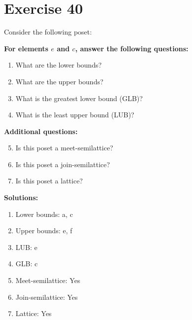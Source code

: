 \documentclass{article}
\begin{document}
\section*{Exercise 40}
Consider the following poset:
\begin{center}
\end{center}

    \textbf{For elements $e$ and $c$, answer the following questions:}
\begin{enumerate}
    \item What are the lower bounds?
    \item What are the upper bounds?
    \item What is the greatest lower bound (GLB)?
    \item What is the least upper bound (LUB)?
\end{enumerate}
    \hspace*{3ex} \textbf{Additional questions:}
\begin{enumerate}
    \setcounter{enumi}{4}
    \item Is this poset a meet-semilattice?
    \item Is this poset a join-semilattice?
    \item Is this poset a lattice?
\end{enumerate}

\textbf{Solutions:}
\begin{enumerate}
    \item Lower bounds: {a, c}
    \item Upper bounds: {e, f}
    \item LUB: e
    \item GLB: c
    \item Meet-semilattice: Yes
    \item Join-semilattice: Yes
    \item Lattice: Yes
\end{enumerate}
\newpage
\end{document}
